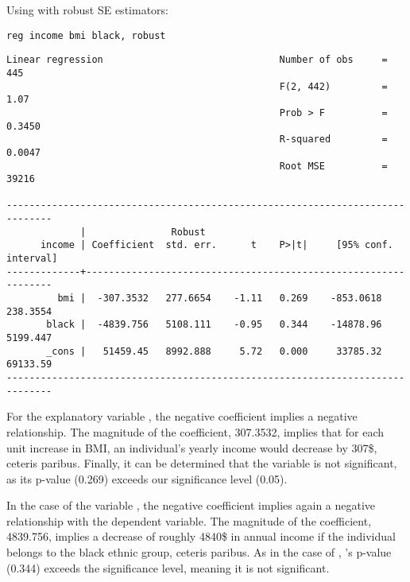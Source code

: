 

Using  with robust SE estimators:

\begin{verbatim}
reg income bmi black, robust
\end{verbatim}

\begin{verbatim}
Linear regression                               Number of obs     =        445
                                                F(2, 442)         =       1.07
                                                Prob > F          =     0.3450
                                                R-squared         =     0.0047
                                                Root MSE          =      39216

------------------------------------------------------------------------------
             |               Robust
      income | Coefficient  std. err.      t    P>|t|     [95% conf. interval]
-------------+----------------------------------------------------------------
         bmi |  -307.3532   277.6654    -1.11   0.269    -853.0618    238.3554
       black |  -4839.756   5108.111    -0.95   0.344    -14878.96    5199.447
       _cons |   51459.45   8992.888     5.72   0.000     33785.32    69133.59
------------------------------------------------------------------------------    
\end{verbatim}


For the explanatory variable , the negative coefficient implies a negative relationship. The magnitude of the coefficient, 307.3532, implies that for each unit increase in BMI, an individual's yearly income would decrease by 307\$, ceteris paribus. Finally, it can be determined that the  variable is not significant, as its p-value (0.269) exceeds our significance level (0.05).

In the case of the variable , the negative coefficient implies again a negative relationship with the dependent variable. The magnitude of the coefficient, 4839.756, implies a decrease of roughly 4840\$ \space in annual income if the individual belongs to the black ethnic group, ceteris paribus. As in the case of , 's p-value (0.344) exceeds the significance level, meaning it is not significant.

